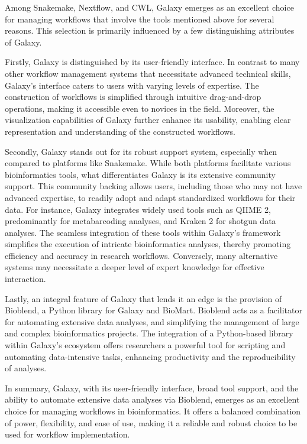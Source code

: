             Among Snakemake, Nextflow, and CWL, Galaxy emerges as an excellent choice for managing workflows that involve the tools mentioned above for several reasons. This selection is primarily influenced by a few distinguishing attributes of Galaxy.
            
            Firstly, Galaxy is distinguished by its user-friendly interface. In contrast to many other workflow management systems that necessitate advanced technical skills, Galaxy's interface caters to users with varying levels of expertise. The construction of workflows is simplified through intuitive drag-and-drop operations, making it accessible even to novices in the field. Moreover, the visualization capabilities of Galaxy further enhance its usability, enabling clear representation and understanding of the constructed workflows.
            
            Secondly, Galaxy stands out for its robust support system, especially when compared to platforms like Snakemake. While both platforms facilitate various bioinformatics tools, what differentiates Galaxy is its extensive community support. This community backing allows users, including those who may not have advanced expertise, to readily adopt and adapt standardized workflows for their data. For instance, Galaxy integrates widely used tools such as QIIME 2, predominantly for metabarcoding analyses, and Kraken 2 for shotgun data analyses. The seamless integration of these tools within Galaxy's framework simplifies the execution of intricate bioinformatics analyses, thereby promoting efficiency and accuracy in research workflows. Conversely, many alternative systems may necessitate a deeper level of expert knowledge for effective interaction.
            
            Lastly, an integral feature of Galaxy that lends it an edge is the provision of Bioblend, a Python library for Galaxy and BioMart. Bioblend acts as a facilitator for automating extensive data analyses, and simplifying the management of large and complex bioinformatics projects. The integration of a Python-based library within Galaxy's ecosystem offers researchers a powerful tool for scripting and automating data-intensive tasks, enhancing productivity and the reproducibility of analyses.
            
            In summary, Galaxy, with its user-friendly interface, broad tool support, and the ability to automate extensive data analyses via Bioblend, emerges as an excellent choice for managing workflows in bioinformatics. It offers a balanced combination of power, flexibility, and ease of use, making it a reliable and robust choice to be used for workflow implementation.
        
